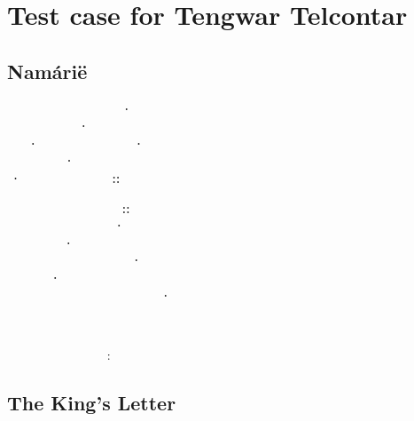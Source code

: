 \documentclass[11pt,a4paper]{article}
\begin{document}
\section*{Test case for Tengwar Telcontar}

\subsection*{Namárië}
\tengtelcTehtaOnSilme
{\tengtelcDecoratedInitially }     ⸱  \\
   ⸱     \\
⸱   ⸱  \\
 {\tengtelcDecoratedInitially } ⸱     \\
⸱  ⸬

      ⸬ \\
  {\tengtelcDecoratedInitially  } ⸱   \\
{\tengtelcDecoratedInitially } ⸱     \\
    ⸱ \\
  ⸱      \\
    {\tengtelcDecoratedInitially }  {\tengtelcDecoratedInitially ⸱}

{\tengtelcDecoratedInitially }   {\tengtelcDecoratedInitially }

   {\tengtelcDecoratedInitially } :

\subsection*{The King’s Letter}
\begin{center}
\tengtelcb
{\bcap  }  \\
   \\
  {\bcap } \\
     \\
    \\
     \\
    {\bcap } \\
       \\
    \\
  {\bul }  \\
  {\bcapul }  \\
  {\bul } ‍ 
\end{center}
\end{document}
